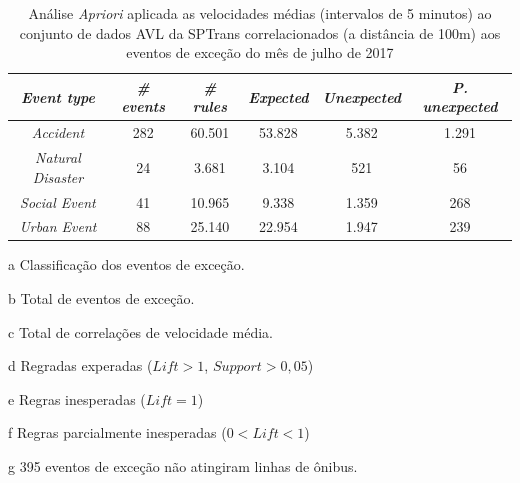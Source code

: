 \documentclass[
	12pt,				%
	oneside,			%
	a4paper,			%
	english,			%
	brazil				%
	]{abntex2ppgsi}
\begin{document}
{{\begin{apendicesenv}
\begin{table}[!htb]
\centering
\begin{threeparttable}
\caption {Análise \textit{Apriori} aplicada as velocidades médias (intervalos de 5 minutos) ao conjunto de dados AVL da SPTrans correlacionados (a distância de 100m) aos eventos de exceção do mês de julho de 2017}
\label {tab:aprioriFull}
\begin{tabular}{c|c|c|c|c|c}
\hline
\textbf{\textit{Event type}}\tnote{a} & \textbf{\textit{\# events}}\tnote{b} & \textit{\textbf{\# rules}}\tnote{c} & \textbf{\textit{Expected}}\tnote{d} & \textbf{\textit{Unexpected}}\tnote{e} & \textbf{\textit{P. unexpected}}\tnote{f}   \\
\hline
\textit{Accident} & 282 & 60.501 & 53.828 & 5.382 & 1.291 \\
\textit{Natural Disaster} & 24 & 3.681 & 3.104 & 521 & 56 \\
\textit{Social Event} & 41 & 10.965 & 9.338 & 1.359 & 268 \\
\textit{Urban Event} & 88 & 25.140 & 22.954 & 1.947 & 239 \\
\hline
\end{tabular}
\begin{tablenotes}
            \item[a] Classificação dos eventos de exceção.
            \item[b] Total de eventos de exceção.
            \item[c] Total de correlações de velocidade média.
            \item[d] Regradas experadas ($Lift > 1$, $Support > 0,05$)
            \item[e] Regras inesperadas ($Lift = 1$)
            \item[f] Regras parcialmente inesperadas ($0 < Lift < 1$)
            \item[g] 395 eventos de exceção não atingiram linhas de ônibus.
        \end{tablenotes}
\end{threeparttable}
\end{table}



\end{apendicesenv}}}
\end{document}
